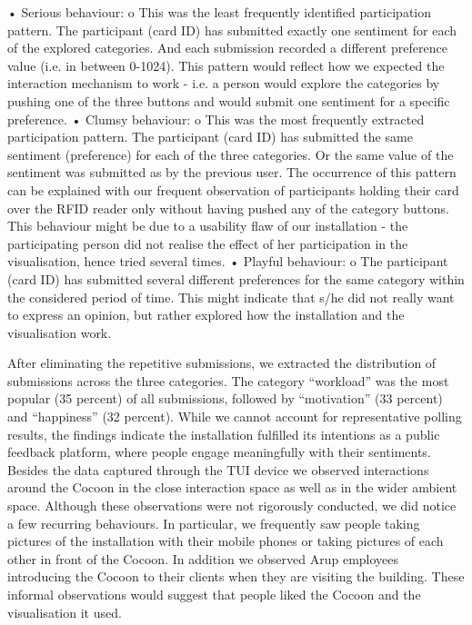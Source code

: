 •	Serious behaviour:
o	This was the least frequently identified participation pattern. The participant (card ID) has submitted exactly one sentiment for each of the explored categories. And each submission recorded a different preference value (i.e. in between 0-1024). This pattern would reflect how we expected the interaction mechanism to work - i.e. a person would explore the categories by pushing one of the three buttons and would submit one sentiment for a specific preference. 
•	Clumsy behaviour: 
o	This was the most frequently extracted participation pattern. The participant (card ID) has submitted the same sentiment (preference) for each of the three categories. Or the same value of the sentiment was submitted as by the previous user. The occurrence of this pattern can be explained with our frequent observation of participants holding their card over the RFID reader only without having pushed any of the category buttons. This behaviour might be due to a usability flaw of our installation - the participating person did not realise the effect of her participation in the visualisation, hence tried several times. 
•	Playful behaviour: 
o	The participant (card ID) has submitted several different preferences for the same category within the considered period of time. This might indicate that s/he did not really want to express an opinion, but rather explored how the installation and the visualisation work. 

After eliminating the repetitive submissions, we extracted the distribution of submissions across the three categories. The category “workload” was the most popular (35 percent) of all submissions, followed by “motivation” (33 percent) and “happiness” (32 percent). While we cannot account for representative polling results, the findings indicate the installation fulfilled its intentions as a public feedback platform, where people engage meaningfully with their sentiments. Besides the data captured through the TUI device we observed interactions around the Cocoon in the close interaction space as well as in the wider ambient space. Although these observations were not rigorously conducted, we did notice a few recurring behaviours. In particular, we frequently saw people taking pictures of the installation with their mobile phones or taking pictures of each other in front of the Cocoon. In addition we observed Arup employees introducing the Cocoon to their clients when they are visiting the building. These informal observations would suggest that people liked the Cocoon and the visualisation it used.



